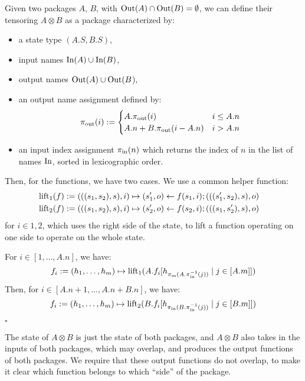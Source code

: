 \begin{definition}
    Given two packages $A$, $B$, with $\text{Out}(A) \cap \text{Out}(B) = \emptyset$,
    we can define their tensoring $A \otimes B$ as a package characterized by:
    \begin{itemize}
        \item a state type $(A.S, B.S)$,
        \item input names $\text{In}(A) \cup \text{In}(B)$,
        \item output names $\text{Out}(A) \cup \text{Out}(B$),
        \item an output name assignment defined by:
        $$
        \pi_{\text{out}}(i) := \begin{cases}
            A.\pi_{\text{out}}(i) & i \leq A.n\cr
            A.n + B.\pi_{\text{out}}(i - A.n) & i > A.n
        \end{cases}
        $$
        \item an input index assignment $\pi_{\text{in}}(n)$ which
        returns the index of $n$ in the list of names $\text{In}$, sorted
        in lexicographic order.
    \end{itemize}

    Then, for the functions, we have two cases.
    We use a common helper function:
    $$
    \begin{aligned}
    &\text{lift}_1(f) := (((s_1, s_2), s), i) \mapsto (s'_1, o) \gets f(s_1, i); (((s'_1, s_2), s), o)\cr
    &\text{lift}_2(f) := (((s_1, s_2), s), i) \mapsto (s'_2, o) \gets f(s_2, i); (((s_1, s'_2), s), o)
    \end{aligned}
    $$
    for $i \in {1, 2}$, which uses the right side of the state, to lift
    a function operating on one side to operate on the whole state.

    For $i \in [1, \ldots, A.n]$, we have:
    $$
    f_i := (h_1, \ldots, h_m) \mapsto
    \text{lift}_1(A.f_i[h_{\pi_{\text{in}}(A.\pi_{\text{in}}^{-1}(j))}\mid j \in [A.m]])
    $$
    Then, for $i \in [A.n + 1, \ldots, A.n + B.n]$, we have:
    $$
    f_i := (h_1, \ldots, h_m) \mapsto
    \text{lift}_2(B.f_i[h_{\pi_{\text{in}}(B.\pi_{\text{in}}^{-1}(j))}\mid j \in [B.m]])
    $$

    $\square$
\end{definition}

The state of $A \otimes B$ is just the state of both packages,
and $A \otimes B$ also takes in the inputs of both packages,
which may overlap, and produces the output functions of both packages.
We require that these output functions do not overlap, to make
it clear which function belongs to which ``side'' of the package.


